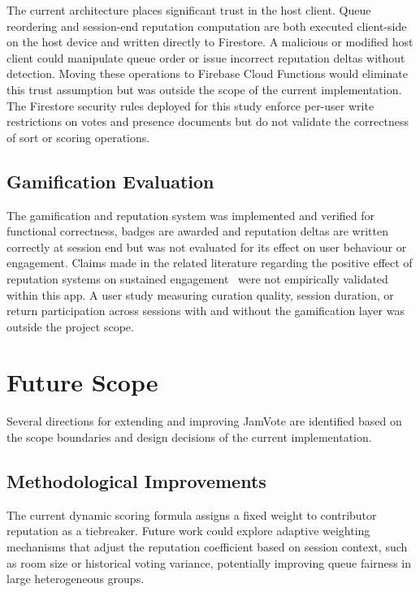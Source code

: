 \documentclass[pdflatex,sn-mathphys-num,iicol]{sn-jnl}
\theoremstyle{thmstyleone}%
\theoremstyle{thmstyletwo}%
\theoremstyle{thmstylethree}%
\begin{document}
The current architecture places significant trust in the host client. Queue
reordering and session-end reputation computation are both executed client-side on
the host device and written directly to Firestore. A malicious or modified host
client could manipulate queue order or issue incorrect reputation deltas without
detection.
Moving these operations to Firebase Cloud Functions would eliminate this trust
assumption but was outside the scope of the current implementation. The Firestore
security rules deployed for this study enforce per-user write restrictions on
votes and presence documents but do not validate the correctness of sort or
scoring operations.

\subsection{Gamification Evaluation}

The gamification and reputation system was implemented and verified for functional
correctness, badges are awarded and reputation deltas are written correctly at
session end but was not evaluated for its effect on user behaviour or engagement.
Claims made in the related literature regarding the positive effect of reputation
systems on sustained engagement~\cite{jamvote_online_community_motivation,
jamvote_gamification_works} were not empirically validated within this app.
A user study measuring curation quality, session duration, or return participation
across sessions with and without the gamification layer was outside the project
scope.


\section{Future Scope}\label{sec:future}

Several directions for extending and improving JamVote are identified based on the
scope boundaries and design decisions of the current implementation.

\subsection{Methodological Improvements}

The current dynamic scoring formula assigns a fixed weight to contributor reputation
as a tiebreaker. Future work could explore adaptive weighting mechanisms that adjust
the reputation coefficient based on session context, such as room size or historical
voting variance, potentially improving queue fairness in large heterogeneous groups.
\end{document}
